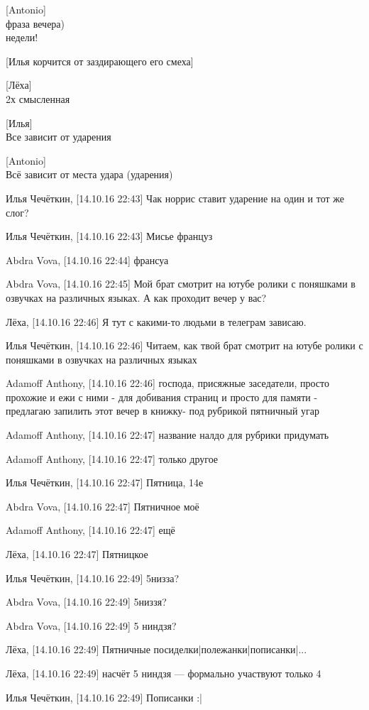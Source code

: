 [Antonio]\\
фраза вечера)\\
недели!


[Илья корчится от заздирающего его смеха]


[Лёха]\\
2х смысленная


[Илья]\\
Все зависит от ударения


[Antonio]\\
Всё зависит от места удара (ударения)


Илья Чечёткин, [14.10.16 22:43]
Чак норрис ставит ударение на один и тот же слог?

Илья Чечёткин, [14.10.16 22:43]
Мисье француз

Abdra Vova, [14.10.16 22:44]
франсуа

Abdra Vova, [14.10.16 22:45]
Мой брат смотрит на ютубе ролики с поняшками в озвучках на различных языках. А как проходит вечер у вас?

Лёха, [14.10.16 22:46]
Я тут с какими-то людьми в телеграм зависаю.

Илья Чечёткин, [14.10.16 22:46]
Читаем, как твой брат смотрит на ютубе ролики с поняшками в озвучках на различных языках

Adamoff Anthony, [14.10.16 22:46]
господа, присяжные заседатели, просто прохожие и ежи с ними - для добивания страниц и просто для памяти - предлагаю запилить этот вечер в книжку- под рубрикой пятничный угар

Adamoff Anthony, [14.10.16 22:47]
название налдо для рубрики придумать

Adamoff Anthony, [14.10.16 22:47]
только другое

Илья Чечёткин, [14.10.16 22:47]
Пятница, 14е

Abdra Vova, [14.10.16 22:47]
Пятничное моё

Adamoff Anthony, [14.10.16 22:47]
ещё

Лёха, [14.10.16 22:47]
Пятницкое

Илья Чечёткин, [14.10.16 22:49]
5низза?

Abdra Vova, [14.10.16 22:49]
5низзя?

Abdra Vova, [14.10.16 22:49]
5 ниндзя?

Лёха, [14.10.16 22:49]
Пятничные посиделки|полежанки|пописанки|...

Лёха, [14.10.16 22:49]
насчёт 5 ниндзя — формально участвуют только 4

Илья Чечёткин, [14.10.16 22:49]
Пописанки :|

